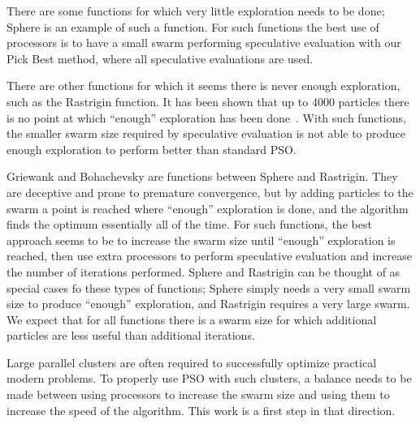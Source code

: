 \documentclass{llncs}
\begin{document}
There are some functions for which very little exploration needs to be done;
Sphere is an example of such a function.  For such functions the best use of
processors is to have a small swarm performing speculative evaluation with our
Pick Best method, where all speculative evaluations are used.

There are other functions for which it seems there is never enough exploration,
such as the Rastrigin function.  It has been shown that up to 4000 particles
there is no point at which ``enough'' exploration has been
done~\cite{mcnabb-2009-large-particle-swarms}.  With such functions, the
smaller swarm size required by speculative evaluation is not able to produce
enough exploration to perform better than standard PSO.

Griewank and Bohachevsky are functions between Sphere and Rastrigin.  They are
deceptive and prone to premature convergence, but by adding particles to the
swarm a point is reached where ``enough'' exploration is done, and the algorithm finds the optimum essentially all of the time.  For such functions, the best approach seems to be to increase the swarm size until ``enough'' exploration is reached, then use extra processors to perform speculative evaluation and increase the number of iterations performed.  Sphere and Rastrigin can be thought of as special cases fo these types of functions; Sphere simply needs a very small swarm size to produce ``enough'' exploration, and Rastrigin requires a very large swarm.  We expect that for all functions there is a swarm size for which additional particles are less useful than additional iterations.

Large parallel clusters are often required to successfully optimize practical modern problems.  To properly use PSO with such clusters, a balance needs to be made between using processors to increase the swarm size and using them to increase the speed of the algorithm.  This work is a first step in that direction.



\end{document}
